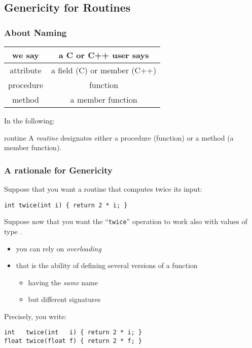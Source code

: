 \documentclass{beamer}
\newcommand{\cpp}{{C++}\xspace}
\newcommand{\kw}[1]{{\color{blue}{\texttt{#1}}}\xspace}
\newcommand{\code}[1]{{\scriptsize{\texttt{#1}}}\xspace}
\begin{document}
\subsection{Genericity for Routines}


\begin{frame}
  \frametitle{About Naming}

  \begin{center}
    \begin{tabular}{|c|c|}
      \hline
      we say & a C or \cpp user says \\
      \hline \hline 
      attribute & a field (C) or member (\cpp) \\
      procedure & function \\
      method & a member function \\
      \hline 
    \end{tabular}
  \end{center}

\smallskip

In the following:
\begin{block}{routine}
  A \emph{routine} designates either a procedure (function) or a
  method (a member function).
\end{block}

\end{frame}


\begin{frame}[fragile]
  \frametitle{A rationale for Genericity}

Suppose that you want a routine that computes twice its input:
\begin{lstlisting}
int twice(int i) { return 2 * i; }
\end{lstlisting}

Suppose now that you want the ``\code{twice}'' operation to work also
with values of type \kw{float}.

\begin{itemize}
\item you can rely on \emph{overloading}
\item that is the ability of defining several versions of a function
  \begin{itemize}
  \item having the \emph{same} name
  \item but different signatures
  \end{itemize}
\end{itemize}

Precisely, you write:
\begin{lstlisting}
int   twice(int   i) { return 2 * i; }
float twice(float f) { return 2 * f; }
\end{lstlisting}

\end{frame}
\end{document}
